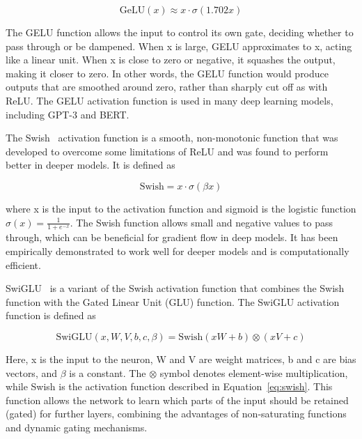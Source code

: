 \begin{equation}
	\text{GeLU}(x) \approx x \cdot \sigma(1.702x)
	\label{eq:geluapprox2}
\end{equation}

The GELU function allows the input to control its own gate, deciding whether to pass through or be dampened.
When x is large, GELU approximates to x, acting like a linear unit.
When x is close to zero or negative, it squashes the output, making it closer to zero.
In other words, the GELU function would produce outputs that are smoothed around zero, rather than sharply cut off as with ReLU\@.
The GELU activation function is used in many deep learning models, including GPT-3 and BERT\@.

The Swish~\cite{ramachandran2017searching} activation function is a smooth, non-monotonic function that was developed to overcome some limitations of ReLU and was found to perform better in deeper models.
It is defined as

\begin{equation}
	\text{Swish} = x \cdot \sigma\left(\beta x\right)
	\label{eq:swish}
\end{equation}

\noindent where x is the input to the activation function and sigmoid is the logistic function \(\sigma(x) = \frac{1}{1+e^{-x}}\).
The Swish function allows small and negative values to pass through, which can be beneficial for gradient flow in deep models.
It has been empirically demonstrated to work well for deeper models and is computationally efficient.

SwiGLU~\cite{shazeer2020glu} is a variant of the Swish activation function that combines the Swish function with the Gated Linear Unit (GLU) function.
The SwiGLU activation function is defined as

\begin{equation}
	\text{SwiGLU}\left(x, W, V, b, c, \beta\right) = \text{Swish}\left(xW + b\right) \otimes \left(xV + c\right)
	\label{eq:swiglu}
\end{equation}

\noindent Here, x is the input to the neuron, W and V are weight matrices, b and c are bias vectors, and $\beta$ is a constant.
The $\otimes$ symbol denotes element-wise multiplication, while Swish is the activation function described in Equation~\ref{eq:swish}.
This function allows the network to learn which parts of the input should be retained (gated) for further layers, combining the advantages of non-saturating functions and dynamic gating mechanisms.

